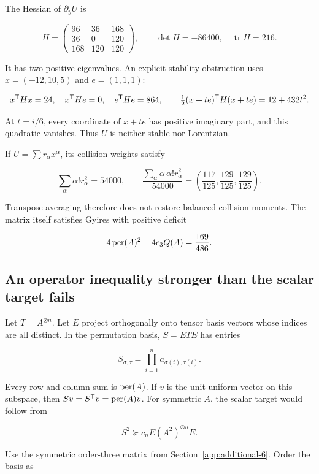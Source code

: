 The Hessian of \(\partial_yU\) is

\[
H=\begin{pmatrix}96&36&168\\36&0&120\\168&120&120\end{pmatrix},
\qquad\det H=-86400,\quad\operatorname{tr}H=216.
\]

It has two positive eigenvalues. An explicit stability obstruction uses \(x=(-12,10,5)\) and \(e=(1,1,1)\):

\[
x^{\mathsf{T}}Hx=24,\quad x^{\mathsf{T}}He=0,\quad e^{\mathsf{T}}He=864,
\qquad\tfrac12(x+te)^{\mathsf{T}}H(x+te)=12+432t^2.
\]

At \(t=i/6\), every coordinate of \(x+te\) has positive imaginary part, and this quadratic vanishes. Thus \(U\) is neither stable nor Lorentzian.

If \(U=\sum r_\alpha x^\alpha\), its collision weights satisfy

\[
\sum_\alpha\alpha!r_\alpha^2=54000,\qquad
\frac{\sum_\alpha\alpha\,\alpha!r_\alpha^2}{54000}
=\left(\frac{117}{125},\frac{129}{125},\frac{129}{125}\right).
\]

Transpose averaging therefore does not restore balanced collision moments. The matrix itself satisfies Gyires with positive deficit

\[
4\operatorname{per}(A)^2-4c_3Q(A)=\frac{169}{486}.
\]

\subsection{An operator inequality stronger than the scalar target fails}\label{app:additional-10}

Let \(T=A^{\otimes n}\). Let \(E\) project orthogonally onto tensor basis vectors whose indices are all distinct. In the permutation basis, \(S=ETE\) has entries

\[
S_{\sigma,\tau}=\prod_{i=1}^n a_{\sigma(i),\tau(i)}.
\]

Every row and column sum is \(\operatorname{per}(A)\). If \(v\) is the unit uniform vector on this subspace, then \(Sv=S^{\mathsf{T}}v=\operatorname{per}(A)v\). For symmetric \(A\), the scalar target would follow from

\begin{equation}
S^2\succeq c_nE(A^2)^{\otimes n}E.
\label{eq:additional-3}
\end{equation}

Use the symmetric order-three matrix from Section~\ref{app:additional-6}. Order the basis as

